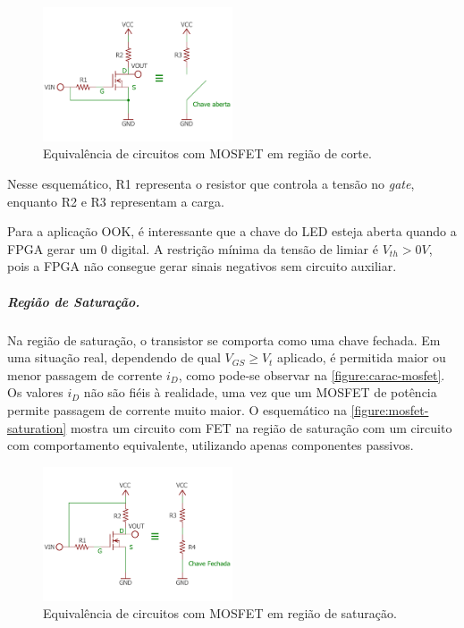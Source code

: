 	\begin{figure}[h]
		\caption{\label{figure:mosfet-cutoff}Equivalência de circuitos com MOSFET em região de corte.}
		\centering
		\includegraphics[width=0.5\textwidth, trim={0cm 2cm 0cm 2cm}, clip]{circuits/mosfet_cutoff.pdf}
	\end{figure}
	
	Nesse esquemático, R1 representa o resistor que controla a tensão no \textit{gate}, enquanto R2 e R3 representam a carga.
	
	Para a aplicação OOK, é interessante que a chave do LED esteja aberta quando a FPGA gerar um 0 digital. A restrição mínima da tensão de limiar é $V_{th} > 0V$, pois a FPGA não consegue gerar sinais negativos sem circuito auxiliar.
	
	\subparagraph{Região de Saturação.}
	
	Na região de saturação, o transistor se comporta como uma chave fechada. Em uma situação real, dependendo de qual $V_{GS} \geq V_{t}$ aplicado, é permitida maior ou menor passagem de corrente $i_{D}$, como pode-se observar na \autoref{figure:carac-mosfet}. Os valores $i_{D}$ não são fiéis à realidade, uma vez que um MOSFET de potência permite passagem de corrente muito maior. O esquemático na \autoref{figure:mosfet-saturation} mostra um circuito com FET na região de saturação com um circuito com comportamento equivalente, utilizando apenas componentes passivos.
	
	\begin{figure}[htb]
		\caption{\label{figure:mosfet-saturation}Equivalência de circuitos com MOSFET em região de saturação.}
		\centering
		\includegraphics[width=0.5\textwidth, trim={0cm 2cm 0cm 2cm}, clip]{circuits/mosfet_saturation.pdf}
	\end{figure}
	
